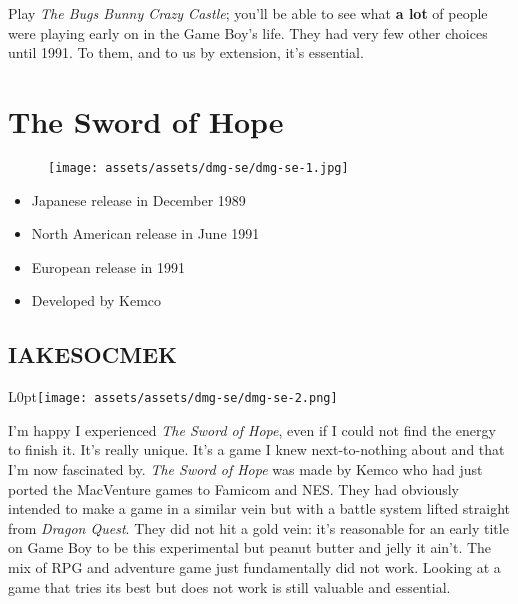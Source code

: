 \documentclass{book}
\begin{document}
Play \emph{The Bugs Bunny Crazy Castle}; you’ll be able to see what \textbf{a lot} of people were playing early on in the Game Boy’s life. They had very few other choices until 1991. To them, and to us by extension, it’s essential.\par
\FloatBarrier\vspace{\baselineskip}\begin{figure}[H]\end{figure}
\chapter*{The Sword of Hope}
\vspace{\baselineskip}\begin{figure}[H]{\texttt{[image: assets/assets/dmg-se/dmg-se-1.jpg]}}\end{figure}\vspace{\baselineskip}
\begin{itemize}[left=0pt, nosep]
\item Japanese release in December 1989
\item North American release in June 1991
\item European release in 1991
\item Developed by Kemco

\end{itemize}
\newpage\FloatBarrier\section*{IAKESOCMEK}
\begin{wrapfigure}{L}{0pt}{\texttt{[image: assets/assets/dmg-se/dmg-se-2.png]}}\end{wrapfigure}\noindent
I’m happy I experienced \emph{The Sword of Hope}, even if I could not find the energy to finish it. It’s really unique. It’s a game I knew next-to-nothing about and that I’m now fascinated by. \emph{The Sword of Hope} was made by Kemco who had just ported the MacVenture games to Famicom and NES. They had obviously intended to make a game in a similar vein but with a battle system lifted straight from \emph{Dragon Quest}. They did not hit a gold vein: it’s reasonable for an early title on Game Boy to be this experimental but peanut butter and jelly it ain’t. The mix of RPG and adventure game just fundamentally did not work. Looking at a game that tries its best but does not work is still valuable and essential.\par
\end{document}
